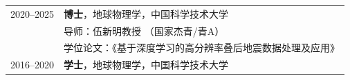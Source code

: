 \begin{longtable}{@{}p{}p{}@{}}
2020--2025 & \textbf{博士}，地球物理学，中国科学技术大学 \\
           & 导师：伍新明教授 {\small\color{darkslategrey}（国家杰青/青A）} \\
           & 学位论文：《基于深度学习的高分辨率叠后地震数据处理及应用》 \\[0.5em]
2016--2020 & \textbf{学士}，地球物理学，中国科学技术大学 \\
\end{longtable}
